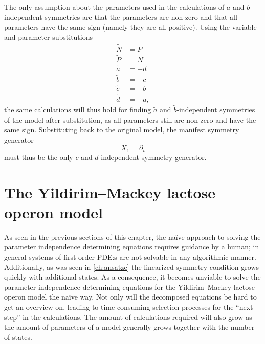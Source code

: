 The only assumption about the parameters used in the calculations of \(a\) and \(b\)-independent symmetries are that the parameters are non-zero and that all parameters have the same sign (namely they are all positive).
Using the variable and parameter substitutions
\begin{align*}
  \tilde{N} &= P \\
  \tilde{P} &= N \\
  \tilde{a} &= -d \\
  \tilde{b} &= -c \\
  \tilde{c} &= -b \\
  \tilde{d} &= -a,
\end{align*}
the same calculations will thus hold for finding \(\tilde{a}\) and \(\tilde{b}\)-independent symmetries of the model after substitution, as all parameters still are non-zero and have the same sign.
Substituting back to the original model, the manifest symmetry generator
\begin{equation*}
  X_1 = \partial_t
\end{equation*}
must thus be the only \(c\) and \(d\)-independent symmetry generator.

\section{The Yildirim--Mackey lactose operon model}

As seen in the previous sections of this chapter, the naïve approach to solving the parameter independence determining equations requires guidance by a human; in general systems of first order PDE:s are not solvable in any algorithmic manner.
Additionally, as was seen in \cref{ch:ansatze} the linearized symmetry condition grows quickly with additional states.
As a consequence, it becomes unviable to solve the parameter independence determining equations for the Yildirim--Mackey lactose operon model the naïve way.
Not only will the decomposed equations be hard to get an overview on, leading to time consuming selection processes for the \enquote{next step} in the calculations.
The amount of calculations required will also grow as the amount of parameters of a model generally grows together with the number of states.

